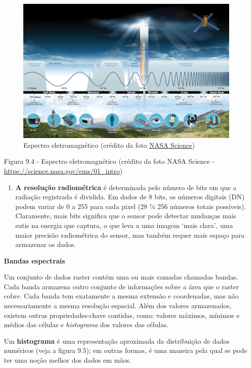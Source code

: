 \documentclass[
  portuguese,
]{krantz}
\providecommand{\tightlist}{%
  \setlength{\itemsep}{0pt}\setlength{\parskip}{0pt}}
\begin{document}
\begin{figure}
\centering
\includegraphics{media/modulo9/fig94.png}
\caption{Espectro eletromagnético (crédito da foto \href{https://science.nasa.gov/ems/01_intro}{NASA Science})}
\end{figure}

Figura 9.4 - Espectro eletromagnético (crédito da foto NASA Science - \url{https://science.nasa.gov/ems/01_intro})

\begin{enumerate}
\def\labelenumi{\arabic{enumi}.}
\setcounter{enumi}{3}
\tightlist
\item
  \textbf{A resolução radiométrica} é determinada pelo número de bits em que a radiação registrada é dividida. Em dados de 8 bits, os números digitais (DN) podem variar de 0 a 255 para cada pixel (28 ¼ 256 números totais possíveis). Claramente, mais bits significa que o sensor pode detectar mudanças mais sutis na energia que captura, o que leva a uma imagem `mais clara', uma maior precisão radiométrica do sensor, mas também requer mais espaço para armazenar os dados.
\end{enumerate}

\textbf{Bandas espectrais}

Um conjunto de dados raster contém uma ou mais camadas chamadas bandas. Cada banda armazena outro conjunto de informações sobre a área que o raster cobre. Cada banda tem exatamente a mesma extensão e coordenadas, mas não necessariamente a mesma resolução espacial. Além dos valores armazenados, existem outras propriedades-chave contidas, como: valores máximos, mínimos e médios das células e \emph{histograma} dos valores das células.

Um \textbf{histograma} é uma representação aproximada da distribuição de dados numéricos (veja a figura 9.5); em outras formas, é uma maneira pela qual se pode ter uma noção melhor dos dados em mãos.
\end{document}
